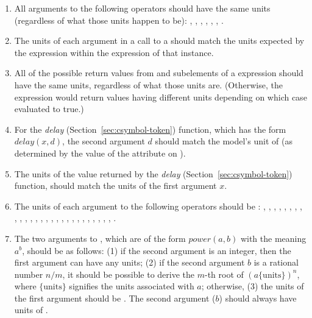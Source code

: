 \begin{enumerate}

\item All arguments to the following operators should have the same
  units (regardless of what those units happen to be):
  , , ,  ,
  , , .

\item The units of each argument in a call to a
  \FunctionDefinition should match the units expected by the
   expression within the  expression of
  that \FunctionDefinition instance.


\item All of the possible return values from  and
   subelements of a  expression
  should have the same units, regardless of what those units are.
  (Otherwise, the  expression would return values
  having different units depending on which case evaluated to
  true.)

\item For the \emph{delay} 
  (Section~\ref{sec:csymbol-token}) function, which has the form
  $delay(x, d)$, the second argument $d$ should match the model's
  unit of  (as determined by the value of the
   attribute on \Model).

\item The units of the value returned by the \emph{delay} 
  (Section~\ref{sec:csymbol-token}) function, should match the units of the
  first argument $x$.

\item The units of each argument to the following operators should
  be : , , ,
  , , , ,
  , , , ,
  , , , ,
  , , , ,
  , , , ,
  , , ,
  , .

\item The two arguments to , which are of the form
  $\textit{power}(a,b)$ with the meaning $a^b$, should be as
  follows: (1) if the second argument is an integer, then the
  first argument can have any units; (2) if the second argument
  $b$ is a rational number $n/m$, it should be possible to derive
  the $m$-th root of $(a \{\text{units}\})^n$, where
  $\{\text{units}\}$ signifies the units associated with $a$;
  otherwise, (3) the units of the first argument should be
  .  The second argument ($b$) should always
  have units of .


\end{enumerate}
